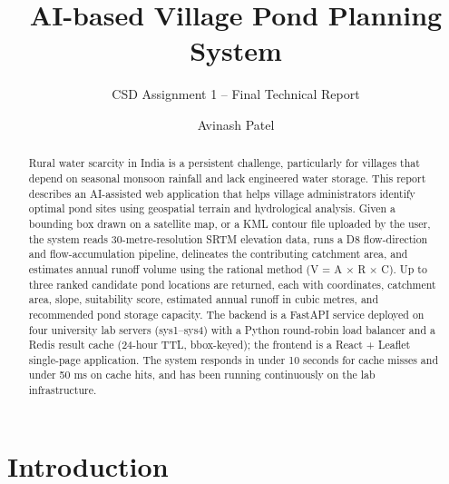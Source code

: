\documentclass[manuscript,screen,review]{acmart}
\begin{document}
\title{AI-based Village Pond Planning System}
\subtitle{CSD Assignment 1 -- Final Technical Report}

\author{Avinash Patel}

\renewcommand{\shortauthors}{Patel}

\begin{abstract}
Rural water scarcity in India is a persistent challenge, particularly
for villages that depend on seasonal monsoon rainfall and lack
engineered water storage. This report describes an AI-assisted web
application that helps village administrators identify optimal pond
sites using geospatial terrain and hydrological analysis. Given a
bounding box drawn on a satellite map, or a KML contour file
uploaded by the user, the system reads 30-metre-resolution SRTM
elevation data, runs a D8 flow-direction and flow-accumulation
pipeline, delineates the contributing catchment area, and estimates
annual runoff volume using the rational method (V = A × R × C). Up
to three ranked candidate pond locations are returned, each with
coordinates, catchment area, slope, suitability score, estimated
annual runoff in cubic metres, and recommended pond storage capacity.
The backend is a FastAPI service deployed on four university lab
servers (sys1--sys4) with a Python round-robin load balancer and a
Redis result cache (24-hour TTL, bbox-keyed); the frontend is a
React + Leaflet single-page application. The system responds in under
10 seconds for cache misses and under 50 ms on cache hits, and has
been running continuously on the lab infrastructure.
\end{abstract}


\maketitle

\section{Introduction}
\label{sec:intro}
\end{document}

